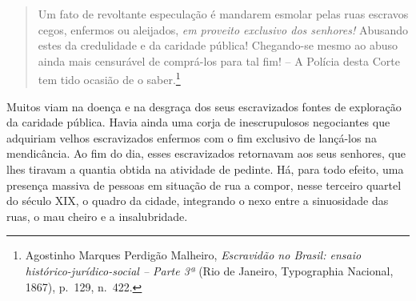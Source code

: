 \begin{quote}
Um fato de revoltante especulação é mandarem esmolar pelas ruas escravos
cegos, enfermos ou aleijados, \emph{em proveito exclusivo dos senhores!}
Abusando estes da credulidade e da caridade pública! Chegando-se mesmo
ao abuso ainda mais censurável de comprá-los para tal fim! -- A Polícia
desta Corte tem tido ocasião de o saber.\footnote{Agostinho Marques
  Perdigão Malheiro, \emph{Escravidão no Brasil: ensaio
  histórico-jurídico-social -- Parte 3ª} (Rio de Janeiro, Typographia
  Nacional, 1867), p.~129, n.~422.}
\end{quote}

Muitos viam na doença e na desgraça dos seus escravizados fontes de
exploração da caridade pública. Havia ainda uma corja de inescrupulosos
negociantes que adquiriam velhos escravizados enfermos com o fim
exclusivo de lançá-los na mendicância. Ao fim do dia, esses escravizados
retornavam aos seus senhores, que lhes tiravam a quantia obtida na
atividade de pedinte. Há, para todo efeito, uma presença massiva de
pessoas em situação de rua a compor, nesse terceiro quartel do século
XIX, o quadro da cidade, integrando o nexo entre a sinuosidade das ruas,
o mau cheiro e a insalubridade.

